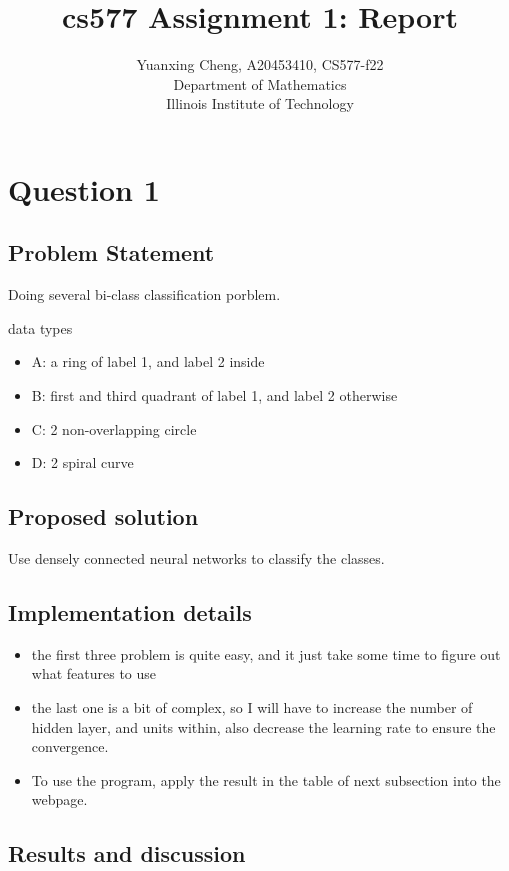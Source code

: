 \documentclass{article}
\title{cs577 Assignment 1: Report}
\author{Yuanxing Cheng, A20453410, CS577-f22\\ Department of Mathematics \\Illinois Institute of Technology}
\begin{document}
\maketitle

\section*{Question 1}
\subsection*{Problem Statement}

Doing several bi-class classification porblem.

data types
\begin{itemize}
    \item A: a ring of label 1, and label 2 inside
    \item B: first and third quadrant of label 1, and label 2 otherwise
    \item C: 2 non-overlapping circle
    \item D: 2 spiral curve
\end{itemize}

\subsection*{Proposed solution}
Use densely connected neural networks to classify the classes.

\subsection*{Implementation details}
\begin{itemize}
    \item the first three problem is quite easy, and it just take some time to figure out what features to use
    \item the last one is a bit of complex, so I will have to increase the number of hidden layer, and units within, also decrease the learning rate to ensure the convergence.
    \item To use the program, apply the result in the table of next subsection into the webpage.
\end{itemize}

\subsection*{Results and discussion}
\end{document}
